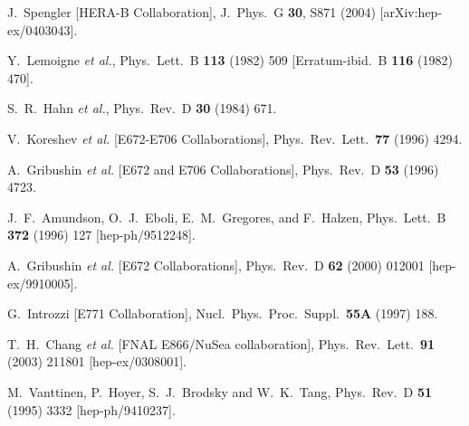 \begin{thebibliography}{999}
J.~Spengler  [HERA-B Collaboration],
J.\ Phys.\ G {\bf 30}, S871 (2004)
[arXiv:hep-ex/0403043].

Y.~Lemoigne {\it et al.},
Phys.\ Lett.\ B {\bf 113} (1982) 509
[Erratum-ibid.\ B {\bf 116} (1982) 470].

S.~R.~Hahn {\it et al.},
Phys.\ Rev.\ D {\bf 30} (1984) 671.

V.~Koreshev {\it et al.}  [E672-E706 Collaborations],
Phys.\ Rev.\ Lett.\  {\bf 77} (1996) 4294.

A.~Gribushin {\it et al.}  [E672 and E706 Collaborations],
Phys.\ Rev.\ D {\bf 53} (1996) 4723.

J.~F.~Amundson, O.~J.~Eboli, E.~M.~Gregores, and F.~Halzen,
Phys.\ Lett.\ B {\bf 372} (1996) 127 
[hep-ph/9512248].


A.~Gribushin {\it et al.}  [E672 Collaborations],
Phys.\ Rev.\ D {\bf 62} (2000) 012001
[hep-ex/9910005].

G.~Introzzi  [E771 Collaboration],
Nucl.\ Phys.\ Proc.\ Suppl.\  {\bf 55A} (1997) 188.

T.~H.~Chang {\it et al.}  [FNAL E866/NuSea collaboration],
Phys.\ Rev.\ Lett.\  {\bf 91} (2003) 211801
[hep-ex/0308001].

M.~Vanttinen, P.~Hoyer, S.~J.~Brodsky and W.~K.~Tang,
Phys.\ Rev.\ D {\bf 51} (1995) 3332
[hep-ph/9410237].


\end{thebibliography}
